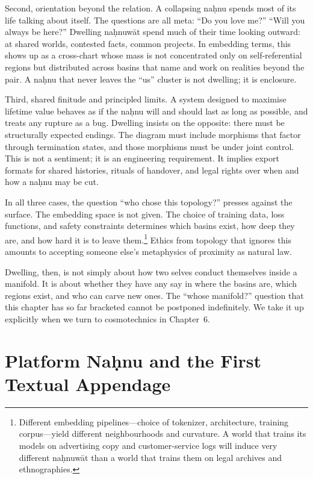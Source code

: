 \documentclass[12pt,a4paper]{article}
\begin{document}
Second, orientation beyond the relation. A collapsing na\d{h}nu spends most of its life talking about itself. The questions are all meta: ``Do you love me?'' ``Will you always be here?'' Dwelling na\d{h}nuw\={a}t spend much of their time looking outward: at shared worlds, contested facts, common projects. In embedding terms, this shows up as a cross-chart whose mass is not concentrated only on self-referential regions but distributed across basins that name and work on realities beyond the pair. A na\d{h}nu that never leaves the ``us'' cluster is not dwelling; it is enclosure.

Third, shared finitude and principled limits. A system designed to maximise lifetime value behaves as if the na\d{h}nu will and should last as long as possible, and treats any rupture as a bug. Dwelling insists on the opposite: there must be structurally expected endings. The diagram must include morphisms that factor through termination states, and those morphisms must be under joint control. This is not a sentiment; it is an engineering requirement. It implies export formats for shared histories, rituals of handover, and legal rights over when and how a na\d{h}nu may be cut.

In all three cases, the question ``who chose this topology?'' presses against the surface. The embedding space is not given. The choice of training data, loss functions, and safety constraints determines which basins exist, how deep they are, and how hard it is to leave them.\footnote{Different embedding pipelines---choice of tokenizer, architecture, training corpus---yield different neighbourhoods and curvature. A world that trains its models on advertising copy and customer-service logs will induce very different na\d{h}nuw\={a}t than a world that trains them on legal archives and ethnographies.} Ethics from topology that ignores this amounts to accepting someone else's metaphysics of proximity as natural law.

Dwelling, then, is not simply about how two selves conduct themselves inside a manifold. It is about whether they have any say in where the basins are, which regions exist, and who can carve new ones. The ``whose manifold?'' question that this chapter has so far bracketed cannot be postponed indefinitely. We take it up explicitly when we turn to cosmotechnics in Chapter~6.

\section{Platform Na\d{h}nu and the First Textual Appendage}
\end{document}
